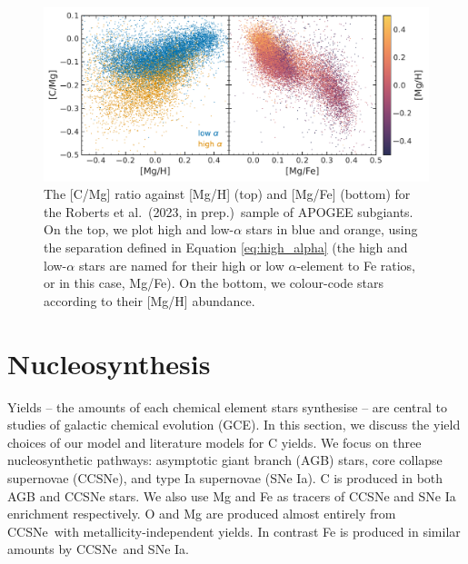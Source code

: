 \documentclass[fleqn,usenatbib]{mnras}
\newcommand{\citetjack}{Roberts et al.~(2023, in prep.)}
\newcommand{\agb}{AGB}
\newcommand{\apogee}{APOGEE}
\newcommand{\cc}{CCSNe}
\newcommand{\ia}{SNe Ia}
\begin{document}


\begin{figure}
    \centering
    \includegraphics{subgiants.pdf}
    \caption[Subgiant Abundances]{The [C/Mg] ratio against [Mg/H] (top) and [Mg/Fe] (bottom) for the \citetjack~sample of \apogee{} subgiants. On the top, we plot high and low-$\alpha$ stars in blue and orange, using the separation defined in Equation \ref{eq:high_alpha} (the high and low-$\alpha$ stars are named for their high or low $\alpha$-element to Fe ratios, or in this case, Mg/Fe). On the bottom, we colour-code stars according to their [Mg/H] abundance.} \label{fig:subgiants}
\end{figure}








\section{Nucleosynthesis}

Yields -- the amounts of each chemical element stars synthesise -- are central to studies of galactic chemical evolution (GCE). 
In this section, we discuss the yield choices of our model and literature models for C yields. 
We focus on three nucleosynthetic pathways: asymptotic giant branch (\agb{}) stars, core collapse supernovae (\cc{}), and type Ia supernovae (\ia{}).
C is produced in both \agb{} and \cc{} stars.
We also use Mg and Fe as tracers of \cc{} and \ia{} enrichment respectively. 
O and Mg are produced almost entirely from \cc\ with metallicity-independent yields. In contrast Fe is produced in similar amounts by \cc\ and \ia.
\end{document}
